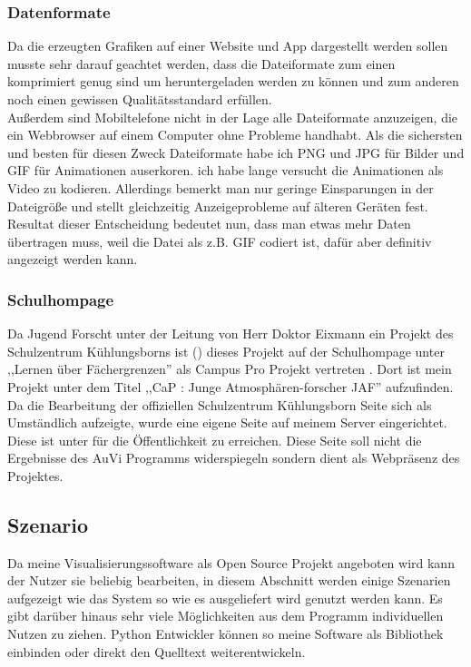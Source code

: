\subsubsection{Datenformate} %
Da die erzeugten Grafiken auf einer Website und App dargestellt werden sollen
musste sehr darauf geachtet werden,
dass die Dateiformate zum einen komprimiert genug sind
um heruntergeladen werden zu können und zum anderen
noch einen gewissen Qualitätsstandard erfüllen.\\
Außerdem sind Mobiltelefone nicht in der Lage alle
Dateiformate anzuzeigen,
die ein Webbrowser auf einem Computer ohne Probleme handhabt.
Als die sichersten und besten für diesen Zweck Dateiformate habe
ich PNG und JPG für Bilder
und GIF für Animationen auserkoren.
ich habe lange versucht die Animationen als Video zu kodieren.
Allerdings bemerkt man nur geringe Einsparungen in der
Dateigröße und stellt gleichzeitig Anzeigeprobleme auf
älteren Geräten fest.
Resultat dieser Entscheidung bedeutet nun, dass man etwas mehr
Daten übertragen muss, weil die Datei als z.B. GIF codiert ist,
dafür aber definitiv angezeigt werden kann.

\subsubsection{Schulhompage} %
Da Jugend Forscht unter der Leitung von Herr Doktor Eixmann
ein Projekt des Schulzentrum Kühlungsborns ist
() dieses Projekt auf der Schulhompage
unter ,,Lernen über Fächergrenzen'' als Campus Pro Projekt vertreten \cite{szkb}.
Dort ist mein Projekt unter dem Titel ,,CaP \jf : Junge Atmosphären-forscher JAF'' aufzufinden.
Da die Bearbeitung der offiziellen Schulzentrum Kühlungsborn Seite sich als Umständlich aufzeigte,
wurde eine eigene Seite auf meinem Server eingerichtet.
Diese ist unter 
für die Öffentlichkeit zu erreichen.
Diese Seite soll nicht die Ergebnisse des AuVi Programms
widerspiegeln sondern dient als Webpräsenz des Projektes.

\subsection{Szenario} %
Da meine Visualisierungssoftware als Open Source Projekt angeboten wird kann der Nutzer
sie beliebig bearbeiten, in diesem Abschnitt werden einige Szenarien aufgezeigt wie das System
so wie es ausgeliefert wird genutzt werden kann.
Es gibt darüber hinaus sehr viele Möglichkeiten aus dem Programm individuellen Nutzen zu ziehen.
Python Entwickler können so meine Software als Bibliothek einbinden oder direkt den Quelltext
weiterentwickeln.

